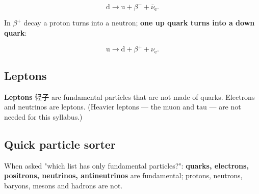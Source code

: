 \documentclass[11pt]{article}
\begin{document}
\[
\text{d} \to \text{u} + \beta^{-} + \bar{\nu}_{\text{e}}.
\]

In $\beta^{+}$ decay a proton turns into a neutron; \textbf{one up quark turns into a down quark}:

\[
\text{u} \to \text{d} + \beta^{+} + \nu_{\text{e}}.
\]

\subsection*{Leptons}

\textbf{Leptons} 轻子 are fundamental particles that are not made of quarks. Electrons and neutrinos are leptons. (Heavier leptons — the muon and tau — are not needed for this syllabus.)

\subsection*{Quick particle sorter}

When asked "which list has only fundamental particles?": \textbf{quarks, electrons, positrons, neutrinos, antineutrinos} are fundamental; protons, neutrons, baryons, mesons and hadrons are not.
\end{document}
